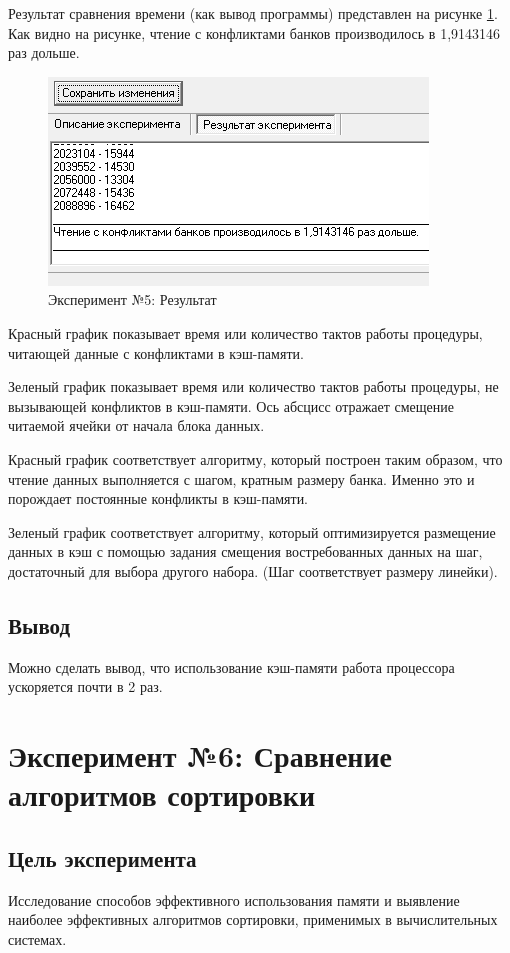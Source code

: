 Результат сравнения времени (как вывод программы) представлен на рисунке \ref{ex:t5-data}. Как видно на рисунке, чтение с конфликтами банков производилось в 1,9143146 раз дольше.

\begin{figure}[h]
	\centering
	\includegraphics[height=0.15\textheight]{img/t5-data}
	\caption{Эксперимент №5: Результат}
	\label{ex:t5-data}
\end{figure}

Красный график показывает время или количество тактов работы процедуры, читающей данные с конфликтами в кэш-памяти. 

Зеленый график показывает время или количество тактов работы процедуры, не вызывающей конфликтов в кэш-памяти. Ось абсцисс отражает смещение читаемой ячейки от начала блока данных.

Красный график соответствует алгоритму, который построен таким образом, что чтение данных выполняется с шагом, кратным размеру банка. Именно это и порождает постоянные конфликты в кэш-памяти.

Зеленый график соответствует алгоритму, который оптимизируется размещение данных в кэш с помощью задания смещения востребованных данных на шаг, достаточный для выбора другого набора. (Шаг соответствует размеру линейки).

\subsection*{Вывод}
Можно сделать вывод, что использование кэш-памяти работа процессора ускоряется почти в 2 раз.

\section*{Эксперимент №6: Сравнение алгоритмов сортировки}

\subsection*{Цель эксперимента}
Исследование способов эффективного использования памяти и выявление наиболее эффективных алгоритмов сортировки, применимых в вычислительных системах. 


